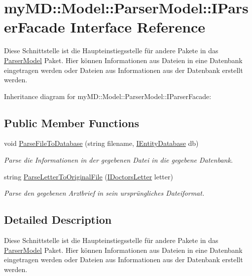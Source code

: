 \hypertarget{interfacemy_m_d_1_1_model_1_1_parser_model_1_1_i_parser_facade}{
\section{my\-MD::Model::Parser\-Model::IParser\-Facade Interface Reference}
\label{d6/d07/interfacemy_m_d_1_1_model_1_1_parser_model_1_1_i_parser_facade}
}
Diese Schnittstelle ist die Haupteinstiegsstelle f\"{u}r andere Pakete in das \hyperlink{namespacemy_m_d_1_1_model_1_1_parser_model}{Parser\-Model} Paket. Hier k\"{o}nnen Informationen aus Dateien in eine Datenbank eingetragen werden oder Dateien aus Informationen aus der Datenbank erstellt werden.  


Inheritance diagram for my\-MD::Model::Parser\-Model::IParser\-Facade:\subsection*{Public Member Functions}
\begin{CompactItemize}
\item 
void \hyperlink{interfacemy_m_d_1_1_model_1_1_parser_model_1_1_i_parser_facade_6ffe5b6c5af78ec3e9cdb29a04560a9f}{Parse\-File\-To\-Database} (string filename, \hyperlink{interfacemy_m_d_1_1_model_1_1_database_model_1_1_i_entity_database}{IEntity\-Database} db)
\begin{CompactList}\small\item\em Parse die Informationen in der gegebenen Datei in die gegebene Datenbank. \item\end{CompactList}\item 
string \hyperlink{interfacemy_m_d_1_1_model_1_1_parser_model_1_1_i_parser_facade_b00612cc050463e46a4078ec61ef5bae}{Parse\-Letter\-To\-Original\-File} (\hyperlink{interfacemy_m_d_1_1_model_interface_1_1_data_model_interface_1_1_i_doctors_letter}{IDoctors\-Letter} letter)
\begin{CompactList}\small\item\em Parse den gegebenen Arztbrief in sein urspr\"{u}ngliches Dateiformat. \item\end{CompactList}\end{CompactItemize}


\subsection{Detailed Description}
Diese Schnittstelle ist die Haupteinstiegsstelle f\"{u}r andere Pakete in das \hyperlink{namespacemy_m_d_1_1_model_1_1_parser_model}{Parser\-Model} Paket. Hier k\"{o}nnen Informationen aus Dateien in eine Datenbank eingetragen werden oder Dateien aus Informationen aus der Datenbank erstellt werden. 



